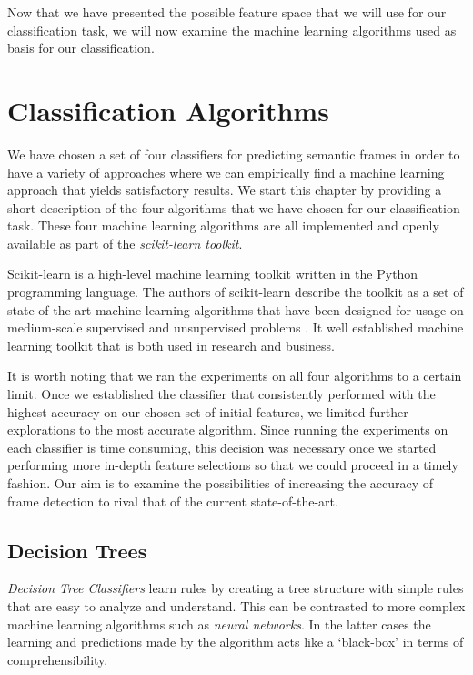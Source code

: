 Now that we have presented the possible feature space that we will use for our classification task, we will now examine the machine learning algorithms used as basis for our classification.

 
\section{Classification Algorithms}

We have chosen a set of four classifiers for predicting semantic frames in order to have a variety of approaches where we can empirically find a machine learning approach that yields satisfactory results. We start this chapter by providing a short description of the four algorithms that we have chosen for our classification task. These four machine learning algorithms are all implemented and openly available as part of the \textit{scikit-learn toolkit}.

Scikit-learn is a high-level machine learning toolkit written in the Python programming language. The authors of scikit-learn describe the toolkit as a set of state-of-the art machine learning algorithms that have been designed for usage on medium-scale supervised and unsupervised problems \cite{scikit-learn}. It well established machine learning toolkit that is both used in research and business.

It is worth noting that we ran the experiments on all four algorithms to a certain limit. Once we established the classifier that consistently performed with the highest accuracy on our chosen set of initial features, we limited further explorations to the most accurate algorithm. Since running the experiments on each classifier is time consuming, this decision was necessary once we started performing more in-depth feature selections so that we could proceed in a timely fashion. Our aim is to examine the possibilities of increasing the accuracy of frame detection to rival that of the current state-of-the-art.

\subsection{Decision Trees}

\textit{Decision Tree Classifiers} learn rules by creating a tree structure with simple rules that are easy to analyze and understand. This can be contrasted to more complex machine learning algorithms such as \textit{neural networks}. In the latter cases the learning and predictions made by the algorithm acts like a `black-box' in terms of comprehensibility.

